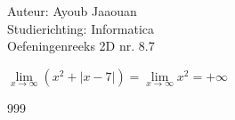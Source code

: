 \documentclass[a4paper]{article}
\begin{document}
\noindent \large Auteur: Ayoub Jaaouan\\
\noindent \large Studierichting: Informatica\\
\noindent \large Oefeningenreeks 2D nr. 8.7\\

\medskip

\normalsize

$\lim\limits_{x \rightarrow \infty} (x^2+|x-7|) = \lim\limits_{x \rightarrow \infty} x^2 = +\infty$\\




\begin{thebibliography}{999}
\end{thebibliography}
\end{document}
